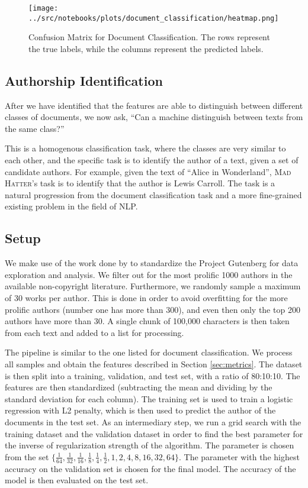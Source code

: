 \begin{figure}[htbp]
    \centering
    \texttt{[image: ../src/notebooks/plots/document\_classification/heatmap.png]} 
    \caption{Confusion Matrix for Document Classification. The rows represent the true labels, while the columns represent the predicted labels.}
    \label{fig:cmatrix_document_classification}
\end{figure}

\subsection{Authorship Identification}
\label{sec:authorship_identification}
After we have identified that the features are able to distinguish between different classes of documents, we now ask, ``Can a machine distinguish between texts from the same class?'' 

This is a homogenous classification task, where the classes are very similar to each other, and the specific task is to identify the author of a text, given a set of candidate authors. 
For example, given the text of ``Alice in Wonderland'', \textsc{Mad Hatter}'s task is to identify that the author is Lewis Carroll. The task is a natural progression from the document classification task and a more fine-grained existing problem in the field of NLP. 

\subsection*{Setup}
We make use of the work done by \cite{gutenberg_dataset} to standardize the Project Gutenberg for data exploration and analysis. We filter out for the most prolific 1000 authors in the available non-copyright literature. Furthermore, we randomly sample a maximum of 30 works per author. This is done in order to avoid overfitting for the more prolific authors (number one has more than 300), and even then only the top 200 authors have more than 30. A single chunk of 100,000 characters is then taken from each text and added to a list for processing. 

The pipeline is similar to the one listed for document classification. We process all samples and obtain the features described in Section \ref{sec:metrics}. The dataset is then split into a training, validation, and test set, with a ratio of 80:10:10. The features are then standardized (subtracting the mean and dividing by the standard deviation for each column). The training set is used to train a logistic regression with L2 penalty, which is then used to predict the author of the documents in the test set. As an intermediary step, we run a grid search with the training dataset and the validation dataset in order to find the best parameter for the inverse of regularization strength of the algorithm. The parameter is chosen from the set $\{\frac{1}{64}, \frac{1}{32}, \frac{1}{16}, \frac{1}{8}, \frac{1}{4}, \frac{1}{2}, 1, 2, 4, 8 , 16, 32 , 64\}$. The parameter with the highest accuracy on the validation set is chosen for the final model. The accuracy of the model is then evaluated on the test set.

